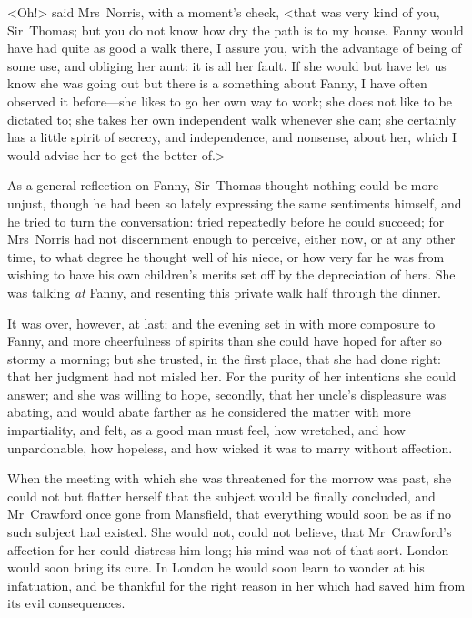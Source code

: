 <Oh!> said Mrs~Norris, with a moment's check, <that was very kind of you, Sir~Thomas; but you do not know how dry the path is to my house. Fanny would have had quite as good a walk there, I assure you, with the advantage of being of some use, and obliging her aunt: it is all her fault. If she would but have let us know she was going out but there is a something about Fanny, I have often observed it before—she likes to go her own way to work; she does not like to be dictated to; she takes her own independent walk whenever she can; she certainly has a little spirit of secrecy, and independence, and nonsense, about her, which I would advise her to get the better of.>

As a general reflection on Fanny, Sir~Thomas thought nothing could be more unjust, though he had been so lately expressing the same sentiments himself, and he tried to turn the conversation: tried repeatedly before he could succeed; for Mrs~Norris had not discernment enough to perceive, either now, or at any other time, to what degree he thought well of his niece, or how very far he was from wishing to have his own children's merits set off by the depreciation of hers. She was talking \textit{at}  Fanny, and resenting this private walk half through the dinner.

It was over, however, at last; and the evening set in with more composure to Fanny, and more cheerfulness of spirits than she could have hoped for after so stormy a morning; but she trusted, in the first place, that she had done right: that her judgment had not misled her. For the purity of her intentions she could answer; and she was willing to hope, secondly, that her uncle's displeasure was abating, and would abate farther as he considered the matter with more impartiality, and felt, as a good man must feel, how wretched, and how unpardonable, how hopeless, and how wicked it was to marry without affection.

When the meeting with which she was threatened for the morrow was past, she could not but flatter herself that the subject would be finally concluded, and Mr~Crawford once gone from Mansfield, that everything would soon be as if no such subject had existed. She would not, could not believe, that Mr~Crawford's affection for her could distress him long; his mind was not of that sort. London would soon bring its cure. In London he would soon learn to wonder at his infatuation, and be thankful for the right reason in her which had saved him from its evil consequences.

